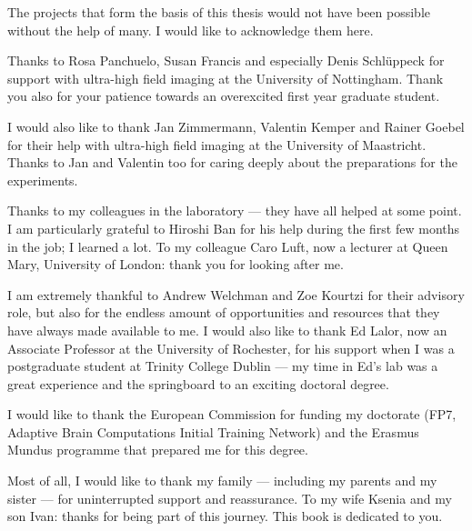 

\begin{acknowledgements}      %

  The projects that form the basis of this thesis would not have been possible without the help of many. I would like to acknowledge them here. 

  Thanks to Rosa Panchuelo, Susan Francis and especially Denis Schl\"{u}ppeck for support with ultra-high field imaging at the University of Nottingham. Thank you also for your patience towards an overexcited first year graduate student.

  I would also like to thank Jan Zimmermann, Valentin Kemper and Rainer Goebel for their help with ultra-high field imaging at the University of Maastricht. Thanks to Jan and Valentin too for caring deeply about the preparations for the experiments.

  Thanks to my colleagues in the laboratory --- they have all helped at some point. I am particularly grateful to Hiroshi Ban for his help during the first few months in the job; I learned a lot. To my colleague Caro Luft, now a lecturer at Queen Mary, University of London: thank you for looking after me.

  I am extremely thankful to Andrew Welchman and Zoe Kourtzi for their advisory role, but also for the endless amount of opportunities and resources that they have always made available to me. I would also like to thank Ed Lalor, now an Associate Professor at the University of Rochester, for his support when I was a postgraduate student at Trinity College Dublin --- my time in Ed's lab was a great experience and the springboard to an exciting doctoral degree.
  
  I would like to thank the European Commission for funding my doctorate (FP7, Adaptive Brain Computations Initial Training Network) and the Erasmus Mundus programme that prepared me for this degree.

  Most of all, I would like to thank my family --- including my parents and my sister --- for uninterrupted support and reassurance. To my wife Ksenia and my son Ivan: thanks for being part of this journey. This book is dedicated to you.

\end{acknowledgements}


